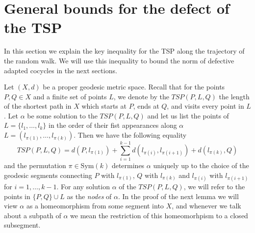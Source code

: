 
\section{General bounds for the defect of the TSP}
In this section we explain the key inequality for the TSP along the trajectory of the random walk. We will use this inequality to bound the norm of defective adapted cocycles in the next sections.

Let $(X,d)$ be a proper geodesic metric space. Recall that for the points $P, Q \in X$ and a finite set of points $L$, we denote by the $TSP(P,L,Q)$ the length of the shortest path in $X$ which starts at $P$, ends at $Q$, and visits every point in $L$. Let $\alpha$ be some solution to the $TSP(P,L,Q)$ and let us list the points of $L=\{l_1,\ldots,l_k\}$ in the order of their fist appearances along $\alpha$ $L=(l_{\pi(1)},\ldots,l_{\pi(k)})$. Then we have the following equality $$TSP(P,L,Q)
=d(P,l_{\pi(1)})+\sum_{i=1}^{k-1}d(l_{\pi(i)},l_{\pi(i+1)})+d(l_{\pi(k)},Q)$$ and the permutation $\pi \in \mathrm{Sym}(k) $ determines $\alpha$ uniquely up to the choice of the geodesic segments connecting $P$ with $l_{\pi(1)}$, $Q$  with $l_{\pi(k)}$ and $l_{\pi(i)}$ with $l_{\pi(i+1)}$ for $i=1, \ldots, k-1$. For any solution $\alpha$ of the $TSP(P,L,Q)$, we will refer to the points in $\{P,Q\}\cup L$ as the \textit{nodes} of $\alpha$. In the proof of the next lemma we will view $\alpha$ as a homeomorphism from some segment into $X$, and whenever we talk about a subpath of $\alpha$ we mean the restriction of this homeomorhpism to a closed subsegment.
